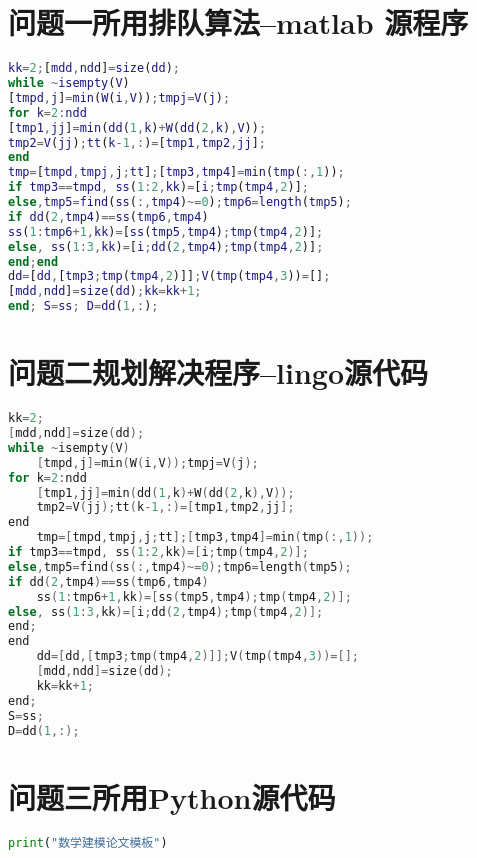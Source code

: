 \documentclass[withoutpreface,bwprint]{cumcmthesis} %
\begin{document}
\newpage
\begin{appendices}

\section{问题一所用排队算法--matlab 源程序}
\begin{lstlisting}[language=matlab]
kk=2;[mdd,ndd]=size(dd);
while ~isempty(V)
[tmpd,j]=min(W(i,V));tmpj=V(j);
for k=2:ndd
[tmp1,jj]=min(dd(1,k)+W(dd(2,k),V));
tmp2=V(jj);tt(k-1,:)=[tmp1,tmp2,jj];
end
tmp=[tmpd,tmpj,j;tt];[tmp3,tmp4]=min(tmp(:,1));
if tmp3==tmpd, ss(1:2,kk)=[i;tmp(tmp4,2)];
else,tmp5=find(ss(:,tmp4)~=0);tmp6=length(tmp5);
if dd(2,tmp4)==ss(tmp6,tmp4)
ss(1:tmp6+1,kk)=[ss(tmp5,tmp4);tmp(tmp4,2)];
else, ss(1:3,kk)=[i;dd(2,tmp4);tmp(tmp4,2)];
end;end
dd=[dd,[tmp3;tmp(tmp4,2)]];V(tmp(tmp4,3))=[];
[mdd,ndd]=size(dd);kk=kk+1;
end; S=ss; D=dd(1,:);
\end{lstlisting}

\section{问题二规划解决程序--lingo源代码}

\begin{lstlisting}[language=c]
kk=2;
[mdd,ndd]=size(dd);
while ~isempty(V)
    [tmpd,j]=min(W(i,V));tmpj=V(j);
for k=2:ndd
    [tmp1,jj]=min(dd(1,k)+W(dd(2,k),V));
    tmp2=V(jj);tt(k-1,:)=[tmp1,tmp2,jj];
end
    tmp=[tmpd,tmpj,j;tt];[tmp3,tmp4]=min(tmp(:,1));
if tmp3==tmpd, ss(1:2,kk)=[i;tmp(tmp4,2)];
else,tmp5=find(ss(:,tmp4)~=0);tmp6=length(tmp5);
if dd(2,tmp4)==ss(tmp6,tmp4)
    ss(1:tmp6+1,kk)=[ss(tmp5,tmp4);tmp(tmp4,2)];
else, ss(1:3,kk)=[i;dd(2,tmp4);tmp(tmp4,2)];
end;
end
    dd=[dd,[tmp3;tmp(tmp4,2)]];V(tmp(tmp4,3))=[];
    [mdd,ndd]=size(dd);
    kk=kk+1;
end;
S=ss;
D=dd(1,:);
 \end{lstlisting}
\section{问题三所用Python源代码}
\begin{lstlisting}[language=Python]
print("数学建模论文模板")
\end{lstlisting}
\end{appendices}
\end{document}
